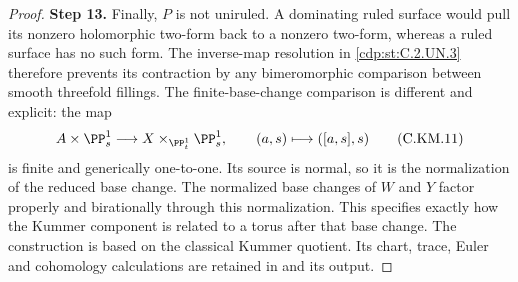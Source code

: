 \begin{proof}
\noindent\textbf{Step 13.} Finally, $P$ is not uniruled. A dominating ruled surface
would pull its nonzero holomorphic two-form back to a
nonzero two-form, whereas a ruled surface has no such
form. The inverse-map resolution in \ref{cdp:st:C.2.UN.3} therefore
prevents its contraction by any bimeromorphic comparison
between smooth threefold fillings. The finite-base-change
comparison is different and explicit: the map
\[
 A\times\PP^1_s\longrightarrow
 X\times_{\PP^1_t}\PP^1_s,
         \qquad(a,s)\longmapsto([a,s],s)               \tag{C.KM.11}\label{cdp:eq:C.KM.11}
\]
is finite and generically one-to-one. Its source is
normal, so it is the normalization of the reduced
base change. The normalized base changes of $W$ and
$Y$ factor properly and birationally through this
normalization. This specifies exactly how the Kummer
component is related to a torus after that base change.
The construction is based on the classical Kummer
quotient. Its chart,
trace, Euler and cohomology calculations are retained
in  and its output.
\end{proof}
